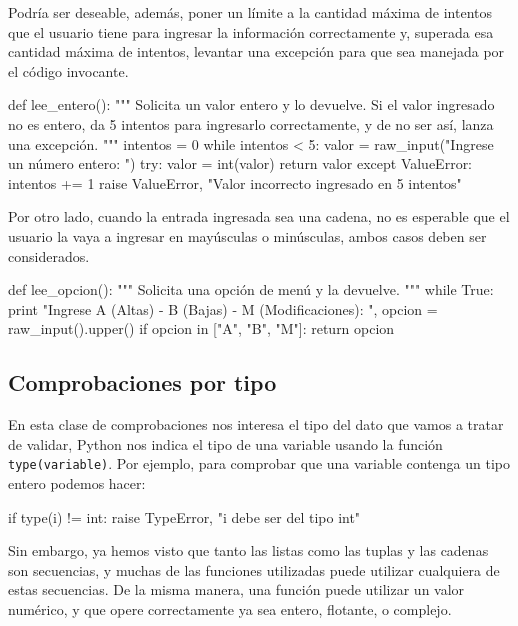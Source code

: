 Podría ser deseable, además, poner un límite a la cantidad máxima de intentos
que el usuario tiene para ingresar la información correctamente y, superada
esa cantidad máxima de intentos, levantar una excepción para que sea manejada
por el código invocante.

\begin{codigo-python-sn}
def lee_entero():
    """ Solicita un valor entero y lo devuelve.
        Si el valor ingresado no es entero, da 5 intentos para ingresarlo
        correctamente, y de no ser así, lanza una excepción. """
    intentos = 0
    while intentos < 5:
        valor = raw_input("Ingrese un número entero: ")
        try:
            valor = int(valor)
            return valor
        except ValueError:
            intentos += 1
    raise ValueError, "Valor incorrecto ingresado en 5 intentos"
\end{codigo-python-sn}

Por otro lado, cuando la entrada ingresada sea una cadena, no es esperable que
el usuario la vaya a ingresar en mayúsculas o minúsculas, ambos casos deben
ser considerados. 

\begin{codigo-python-sn}
def lee_opcion():
    """ Solicita una opción de menú y la devuelve. """
    while True:
        print "Ingrese A (Altas) - B (Bajas) - M (Modificaciones): ",
        opcion = raw_input().upper()
        if opcion in ["A", "B", "M"]:
            return opcion
\end{codigo-python-sn}

\subsection{Comprobaciones por tipo}

En esta clase de comprobaciones nos interesa el tipo del dato que vamos a
tratar de validar, Python nos indica el tipo de una variable usando la
función \lstinline!type(variable)!. Por ejemplo, para comprobar que una
variable contenga un tipo entero podemos hacer:

\begin{codigo-python-sn}
if type(i) != int:
	raise TypeError, "i debe ser del tipo int"
\end{codigo-python-sn}

Sin embargo, ya hemos visto que tanto las listas como las tuplas y las
cadenas son secuencias, y muchas de las funciones utilizadas puede utilizar
cualquiera de estas secuencias. De la misma manera, una función puede
utilizar un valor numérico, y que opere correctamente ya sea entero,
flotante, o complejo. 

